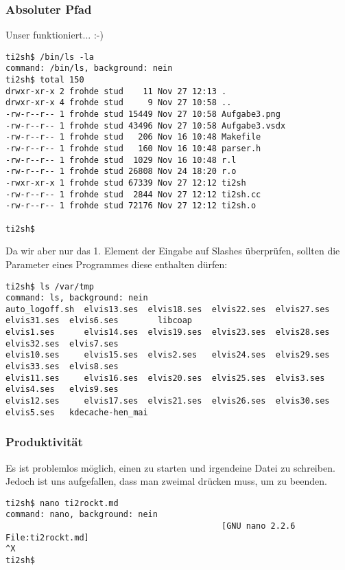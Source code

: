 \clearpage

\subsubsection{Absoluter Pfad}
Unser  funktioniert... :-)
\begin{lstlisting}[numbers=none]
ti2sh$ /bin/ls -la
command: /bin/ls, background: nein
ti2sh$ total 150
drwxr-xr-x 2 frohde stud    11 Nov 27 12:13 .
drwxr-xr-x 4 frohde stud     9 Nov 27 10:58 ..
-rw-r--r-- 1 frohde stud 15449 Nov 27 10:58 Aufgabe3.png
-rw-r--r-- 1 frohde stud 43496 Nov 27 10:58 Aufgabe3.vsdx
-rw-r--r-- 1 frohde stud   206 Nov 16 10:48 Makefile
-rw-r--r-- 1 frohde stud   160 Nov 16 10:48 parser.h
-rw-r--r-- 1 frohde stud  1029 Nov 16 10:48 r.l
-rw-r--r-- 1 frohde stud 26808 Nov 24 18:20 r.o
-rwxr-xr-x 1 frohde stud 67339 Nov 27 12:12 ti2sh
-rw-r--r-- 1 frohde stud  2844 Nov 27 12:12 ti2sh.cc
-rw-r--r-- 1 frohde stud 72176 Nov 27 12:12 ti2sh.o

ti2sh$
\end{lstlisting}

Da wir aber nur das 1. Element der Eingabe auf Slashes überprüfen, sollten die Parameter eines Programmes diese enthalten dürfen:

\begin{lstlisting}[numbers=none]
ti2sh$ ls /var/tmp
command: ls, background: nein
auto_logoff.sh  elvis13.ses  elvis18.ses  elvis22.ses  elvis27.ses  elvis31.ses  elvis6.ses        libcoap
elvis1.ses      elvis14.ses  elvis19.ses  elvis23.ses  elvis28.ses  elvis32.ses  elvis7.ses
elvis10.ses     elvis15.ses  elvis2.ses   elvis24.ses  elvis29.ses  elvis33.ses  elvis8.ses
elvis11.ses     elvis16.ses  elvis20.ses  elvis25.ses  elvis3.ses   elvis4.ses   elvis9.ses
elvis12.ses     elvis17.ses  elvis21.ses  elvis26.ses  elvis30.ses  elvis5.ses   kdecache-hen_mai
\end{lstlisting}
\subsubsection{Produktivität}
Es ist problemlos möglich, einen  zu starten und irgendeine Datei zu schreiben. Jedoch ist uns aufgefallen, dass man  zweimal drücken muss, um  zu beenden.
\begin{lstlisting}[numbers=none]
ti2sh$ nano ti2rockt.md
command: nano, background: nein
                                            [GNU nano 2.2.6         File:ti2rockt.md]
^X
ti2sh$
\end{lstlisting}
